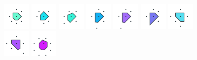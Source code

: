 \documentclass[text.tex]{subfiles}
\begin{document}
\begin{figure}[h!]
\includegraphics[width=0.12\textwidth]{img/results/circle8/circle8_109458_(-1136_471alpha_1)_005.pdf}
\includegraphics[width=0.12\textwidth]{img/results/circle8/circle8_109458_(-1136_471alpha_1)_006.pdf}
\includegraphics[width=0.12\textwidth]{img/results/circle8/circle8_109458_(-1136_471alpha_1)_007.pdf}
\includegraphics[width=0.12\textwidth]{img/results/circle8/circle8_109458_(-1136_471alpha_1)_008.pdf}
\includegraphics[width=0.12\textwidth]{img/results/circle8/circle8_109458_(-1136_471alpha_1)_009.pdf}
\includegraphics[width=0.12\textwidth]{img/results/circle8/circle8_109458_(-1136_471alpha_1)_010.pdf}
\includegraphics[width=0.12\textwidth]{img/results/circle8/circle8_109458_(-1136_471alpha_1)_011.pdf}
\includegraphics[width=0.12\textwidth]{img/results/circle8/circle8_109458_(-1136_471alpha_1)_012.pdf}
\includegraphics[width=0.12\textwidth]{img/results/circle8/circle8_109458_(-1136_471alpha_1)_013.pdf}

\end{figure}
\end{document}
